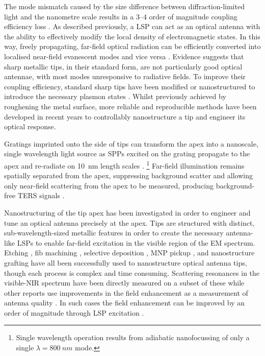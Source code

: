 \documentclass{article}
\begin{document}
The mode mismatch caused by the size difference between diffraction-limited light and the nanometre scale results in a 3--4 order of magnitude coupling efficiency loss \cite{berweger2010}. As described previously, a LSP can act as an optical antenna with the ability to effectively modify the local density of electromagnetic states. In this way, freely propagating, far-field optical radiation can be efficiently converted into localised near-field evanescent modes and vice versa \cite{novotny2006, novotny2011}. Evidence suggests that sharp metallic tips, in their standard form, are not particularly good optical antennae, with most modes unresponsive to radiative fields. To improve their coupling efficiency, standard sharp tips have been modified or nanostructured to introduce the necessary plasmon states \cite{mauser2014}. Whilst previously achieved by roughening the metal surface, more reliable and reproducible methods have been developed in recent years to controllably nanostructure a tip and engineer its optical response.

Gratings imprinted onto the side of tips can transform the apex into a nanoscale, single wavelength light source as SPPs excited on the grating propagate to the apex and re-radiate on \SI{10}{nm} length scales \cite{ropers2007, neacsu2010}.%
\footnote{Single wavelength operation results from adiabatic nanofocussing of only a single $\lambda=\SI{800}{nm}$ mode.}
Far-field illumination remains spatially separated from the apex, suppressing background scatter and allowing only near-field scattering from the apex to be measured, producing background-free TERS signals \cite{berweger2010, berweger2012}.

Nanostructuring of the tip apex has been investigated in order to engineer and tune an optical antenna precisely at the apex. Tips are structured with distinct, sub-wavelength-sized metallic features in order to create the necessary antenna-like LSPs to enable far-field excitation in the visible region of the EM spectrum. Etching \cite{uebel2013, kharintsev2013}, \gls{fib} machining \cite{weber2010, fleischer2011, maouli2015}, selective deposition \cite{zou2009}, MNP pickup \cite{denisyuk2012}, and nanostructure grafting \cite{huth2013} have all been successfully used to nanostructure optical antenna tips, though each process is complex and time consuming. Scattering resonances in the visible-NIR spectrum have been directly measured on a subset of these \cite{zou2009, maouli2015} while other reports use improvements in the field enhancement as a measurement of antenna quality \cite{umakoshi2012, huth2013, kharintsev2013}. In such cases the field enhancement can be improved by an order of magnitude through LSP excitation \cite{weber2010, fleischer2011, umakoshi2012}.
\end{document}
